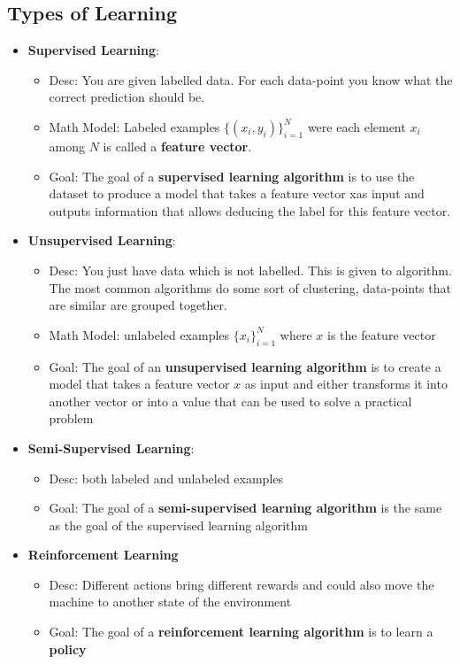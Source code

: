 \documentclass{article}
\begin{document}
\subsection{Types of Learning}
\begin{itemize}
    \item \textbf{Supervised Learning}:
    \begin{itemize}
        \item Desc: You are given labelled data. For each data-point you know what the correct prediction should be.
        \item Math Model: Labeled examples $\{(x_i,y_i)\}^N_{i=1}$ were each element $x_i$ among $N$ is called a \textbf{feature vector}. \newline
        \item Goal: The goal of a \textbf{supervised learning algorithm} is to use the dataset to produce a model
        that takes a feature vector xas input and outputs information that allows deducing the label
        for this feature vector.
    \end{itemize}
    \item \textbf{Unsupervised Learning}:
    \begin{itemize}
        \item Desc: You just have data which is not labelled. This is given to
        algorithm. The most common algorithms do some sort of
        clustering, data-points that are similar are grouped together.
        \item Math Model: unlabeled examples $\{x_i\}^N_{i=1}$ where $x$ is the feature vector
        \item Goal: The goal of an \textbf{unsupervised learning algorithm} is
        to create a model that takes a feature vector $x$ as input and either transforms it into
        another vector or into a value that can be used to solve a practical problem
    \end{itemize}
    \item \textbf{Semi-Supervised Learning}:
    \begin{itemize}
        \item Desc: both labeled and unlabeled examples
        \item Goal: The goal of a \textbf{semi-supervised learning algorithm} is the same as the goal of
        the supervised learning algorithm
    \end{itemize}
    \item \textbf{Reinforcement Learning}
    \begin{itemize}
        \item Desc: Different actions bring different rewards and could also move the machine to another state of the environment
        \item Goal: The goal of a \textbf{reinforcement learning algorithm} is to learn a \textbf{policy}
    \end{itemize}
\end{itemize}
\end{document}
